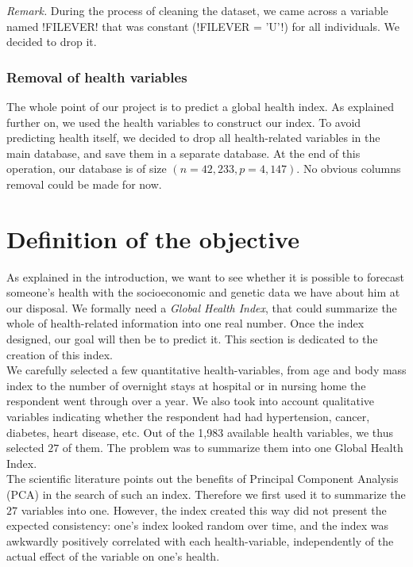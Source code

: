 \documentclass[]{article}
\begin{document}
\noindent
\textit{Remark.} During the process of cleaning the dataset, we came across a variable named \pyth!FILEVER! that was constant (\pyth!FILEVER = 'U'!) for all individuals. We decided to drop it.

\subsubsection{Removal of health variables}
The whole point of our project is to predict a global health index. As explained further on, we used the health variables to construct our index. To avoid predicting health itself, we decided to drop all health-related variables in the main database, and save them in a separate database. At the end of this operation, our database is of size $(n = 42,233, p = 4,147)$. No obvious columns removal could be made for now.

\section{Definition of the objective}
As explained in the introduction, we want to see whether it is possible to forecast someone's health with the socioeconomic and genetic data we have about him at our disposal. We formally need a \textit{Global Health Index}, that could summarize the whole of health-related information into one real number. Once the index designed, our goal will then be to predict it. This section is dedicated to the creation of this index.\\

\noindent
We carefully selected a few quantitative health-variables, from age and body mass index to the number of overnight stays at hospital or in nursing home the respondent went through over a year. We also took into account qualitative variables indicating whether the respondent had had hypertension, cancer, diabetes, heart disease, etc. Out of the 1,983 available health variables, we thus selected $27$ of them. The problem was to summarize them into one Global Health Index.\\

\noindent
The scientific literature\cite{famd2016} points out the benefits of Principal Component Analysis (PCA) \cite{pca1901} in the search of such an index. Therefore we first used it to summarize the $27$ variables into one. However, the index created this way did not present the expected consistency: one's index looked random over time, and the index was awkwardly positively correlated with each health-variable, independently of the actual effect of the variable on one's health.\\
\end{document}
